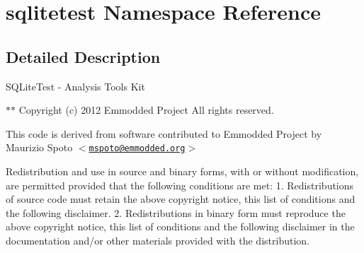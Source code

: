 \hypertarget{namespacesqlitetest}{\section{sqlitetest \-Namespace \-Reference}
\label{namespacesqlitetest}
}


\subsection{\-Detailed \-Description}
\-S\-Q\-Lite\-Test -\/ \-Analysis \-Tools \-Kit

$\ast$$\ast$ \-Copyright (c) 2012 \-Emmodded \-Project \-All rights reserved.

\-This code is derived from software contributed to \-Emmodded \-Project by \-Maurizio \-Spoto $<$\href{mailto:mspoto@emmodded.org}{\tt mspoto@emmodded.\-org}$>$

\-Redistribution and use in source and binary forms, with or without modification, are permitted provided that the following conditions are met\-: 1. \-Redistributions of source code must retain the above copyright notice, this list of conditions and the following disclaimer. 2. \-Redistributions in binary form must reproduce the above copyright notice, this list of conditions and the following disclaimer in the documentation and/or other materials provided with the distribution.

